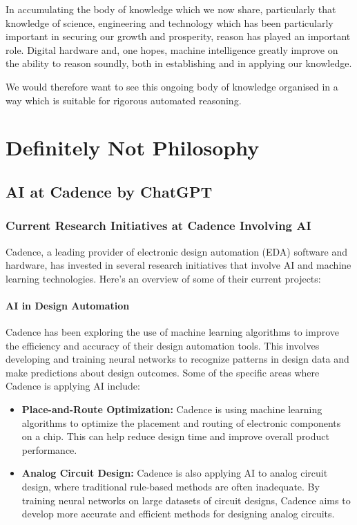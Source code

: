 \documentclass[10pt,titlepage]{book}
\begin{document}
In accumulating the body of knowledge which we now share, particularly that knowledge of science, engineering and technology which has been particularly important in securing our growth and prosperity, reason has played an important role.
Digital hardware and, one hopes, machine intelligence greatly improve on the ability to reason soundly, both in establishing and in applying our knowledge.

We would therefore want to see this ongoing body of knowledge organised in a way which is suitable for rigorous automated reasoning.

\part{Definitely Not Philosophy}


\chapter{AI at Cadence by ChatGPT}

\section{Current Research Initiatives at Cadence Involving AI}

Cadence, a leading provider of electronic design automation (EDA) software and hardware, has invested in several research initiatives that involve AI and machine learning technologies. Here's an overview of some of their current projects:

\subsection{AI in Design Automation}

Cadence has been exploring the use of machine learning algorithms to improve the efficiency and accuracy of their design automation tools. This involves developing and training neural networks to recognize patterns in design data and make predictions about design outcomes. Some of the specific areas where Cadence is applying AI include:

\begin{itemize}
\item \textbf{Place-and-Route Optimization:} Cadence is using machine learning algorithms to optimize the placement and routing of electronic components on a chip. This can help reduce design time and improve overall product performance.

\item \textbf{Analog Circuit Design:} Cadence is also applying AI to analog circuit design, where traditional rule-based methods are often inadequate. By training neural networks on large datasets of circuit designs, Cadence aims to develop more accurate and efficient methods for designing analog circuits.
\end{itemize}
\end{document}
